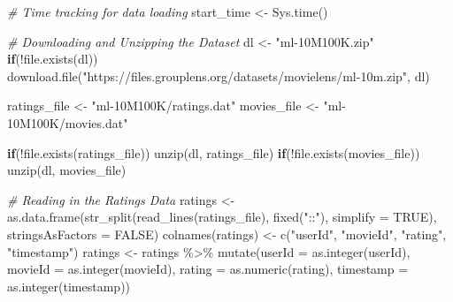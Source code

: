 \documentclass[
]{article}
\newenvironment{Shaded}{}{}
\newcommand{\AttributeTok}[1]{\textcolor[rgb]{0.49,0.56,0.16}{#1}}
\newcommand{\CommentTok}[1]{\textcolor[rgb]{0.38,0.63,0.69}{\textit{#1}}}
\newcommand{\ConstantTok}[1]{\textcolor[rgb]{0.53,0.00,0.00}{#1}}
\newcommand{\ControlFlowTok}[1]{\textcolor[rgb]{0.00,0.44,0.13}{\textbf{#1}}}
\newcommand{\FunctionTok}[1]{\textcolor[rgb]{0.02,0.16,0.49}{#1}}
\newcommand{\NormalTok}[1]{#1}
\newcommand{\OtherTok}[1]{\textcolor[rgb]{0.00,0.44,0.13}{#1}}
\newcommand{\SpecialCharTok}[1]{\textcolor[rgb]{0.25,0.44,0.63}{#1}}
\newcommand{\StringTok}[1]{\textcolor[rgb]{0.25,0.44,0.63}{#1}}
\begin{document}
\begin{Shaded}
\begin{Highlighting}[]
\CommentTok{\# Time tracking for data loading}
\NormalTok{start\_time }\OtherTok{\textless{}{-}} \FunctionTok{Sys.time}\NormalTok{()}

\CommentTok{\# Downloading and Unzipping the Dataset}
\NormalTok{dl }\OtherTok{\textless{}{-}} \StringTok{"ml{-}10M100K.zip"}
\ControlFlowTok{if}\NormalTok{(}\SpecialCharTok{!}\FunctionTok{file.exists}\NormalTok{(dl))}
  \FunctionTok{download.file}\NormalTok{(}\StringTok{"https://files.grouplens.org/datasets/movielens/ml{-}10m.zip"}\NormalTok{, dl)}

\NormalTok{ratings\_file }\OtherTok{\textless{}{-}} \StringTok{"ml{-}10M100K/ratings.dat"}
\NormalTok{movies\_file }\OtherTok{\textless{}{-}} \StringTok{"ml{-}10M100K/movies.dat"}

\ControlFlowTok{if}\NormalTok{(}\SpecialCharTok{!}\FunctionTok{file.exists}\NormalTok{(ratings\_file))}
  \FunctionTok{unzip}\NormalTok{(dl, ratings\_file)}
\ControlFlowTok{if}\NormalTok{(}\SpecialCharTok{!}\FunctionTok{file.exists}\NormalTok{(movies\_file))}
  \FunctionTok{unzip}\NormalTok{(dl, movies\_file)}

\CommentTok{\# Reading in the Ratings Data}
\NormalTok{ratings }\OtherTok{\textless{}{-}} \FunctionTok{as.data.frame}\NormalTok{(}\FunctionTok{str\_split}\NormalTok{(}\FunctionTok{read\_lines}\NormalTok{(ratings\_file), }
                                   \FunctionTok{fixed}\NormalTok{(}\StringTok{"::"}\NormalTok{), }
                                   \AttributeTok{simplify =} \ConstantTok{TRUE}\NormalTok{),}
                         \AttributeTok{stringsAsFactors =} \ConstantTok{FALSE}\NormalTok{)}
\FunctionTok{colnames}\NormalTok{(ratings) }\OtherTok{\textless{}{-}} \FunctionTok{c}\NormalTok{(}\StringTok{"userId"}\NormalTok{, }\StringTok{"movieId"}\NormalTok{, }\StringTok{"rating"}\NormalTok{, }\StringTok{"timestamp"}\NormalTok{)}
\NormalTok{ratings }\OtherTok{\textless{}{-}}\NormalTok{ ratings }\SpecialCharTok{\%\textgreater{}\%} \FunctionTok{mutate}\NormalTok{(}\AttributeTok{userId =} \FunctionTok{as.integer}\NormalTok{(userId), }
                              \AttributeTok{movieId =} \FunctionTok{as.integer}\NormalTok{(movieId),}
                              \AttributeTok{rating =} \FunctionTok{as.numeric}\NormalTok{(rating), }
                              \AttributeTok{timestamp =} \FunctionTok{as.integer}\NormalTok{(timestamp))}


\end{Highlighting}
\end{Shaded}
\end{document}
